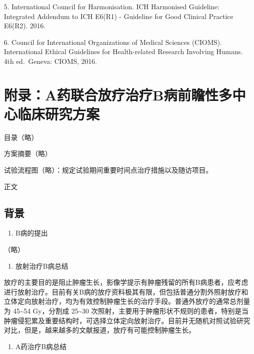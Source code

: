 \documentclass[
  chinese-hans,
  letterpaper,
  DIV=11,
  numbers=noendperiod]{scrreprt}
\providecommand{\tightlist}{%
  \setlength{\itemsep}{0pt}\setlength{\parskip}{0pt}}
\begin{document}
5. International Council for Harmonisation. ICH Harmonised Guideline:
Integrated Addendum to ICH E6(R1) - Guideline for Good Clinical Practice
E6(R2). 2016.

6. Council for International Organizations of Medical Sciences (CIOMS).
International Ethical Guidelines for Health-related Research Involving
Humans. 4th ed.~Geneva: CIOMS, 2016.

\section{附录：A药联合放疗治疗B病前瞻性多中心临床研究方案}\label{ux9644ux5f55aux836fux8054ux5408ux653eux7597ux6cbbux7597bux75c5ux524dux77bbux6027ux591aux4e2dux5fc3ux4e34ux5e8aux7814ux7a76ux65b9ux6848}

目录（略）

方案摘要（略）

试验流程图（略）：规定试验期间重要时间点治疗措施以及随访项目。

正文

\subsection{背景}\label{ux80ccux666f}

\begin{enumerate}
\def\labelenumi{\arabic{enumi}.}
\tightlist
\item
  B病的提出
\end{enumerate}

（略）

\begin{enumerate}
\def\labelenumi{\arabic{enumi}.}
\setcounter{enumi}{1}
\tightlist
\item
  放射治疗B病总结
\end{enumerate}

放疗的主要目的是阻止肿瘤生长，影像学提示有肿瘤残留的所有B病患者，应考虑进行放射治疗。目前有关B病的放疗资料极其有限，但包括普通分割外照射放疗和立体定向放射治疗，均为有效控制肿瘤生长的治疗手段。普通外放疗的通常总剂量为
45\textasciitilde54 Gy，分割成 25\textasciitilde30
次照射，主要用于肿瘤形状不规则的患者，特别是当肿瘤侵犯累及重要结构时，可选择立体定向放射治疗。目前并无随机对照试验研究对比，但是，越来越多的文献报道，放疗有可能控制肿瘤生长。

\begin{enumerate}
\def\labelenumi{\arabic{enumi}.}
\setcounter{enumi}{2}
\tightlist
\item
  A药治疗B病总结
\end{enumerate}
\end{document}
